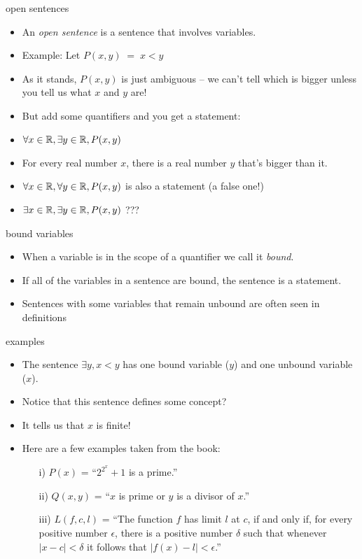 \documentclass[landscape]{beamer}
\begin{document}
\begin{frame}{open sentences}
\begin{itemize}
\item An {\em open sentence} is a sentence that involves variables.\pause
\item Example: Let $P(x,y) \; = \; x < y$\pause
\item As it stands, $P(x,y)$ is just ambiguous -- we can't tell which is bigger unless you tell us what $x$ and $y$ are!\pause
\item But add some quantifiers and you get a statement: \pause
\item $\forall x \in {\mathbb R}, \exists y \in {\mathbb R}, P(x,y)$ \pause
\item For every real number $x$, there is a real number $y$ that's bigger than it. \pause 
\item $\forall x \in {\mathbb R}, \forall y \in {\mathbb R}, P(x,y)$ \pause is also a statement (a false one!) \pause
\item $\exists x \in {\mathbb R}, \exists y \in {\mathbb R}, P(x,y)$ \pause ???
\end{itemize}
\end{frame}

\begin{frame}{bound variables}
\begin{itemize}
\item When a variable is in the scope of a quantifier we call it {\em bound}.\pause
\item If all of the variables in a sentence are bound, the sentence is a statement.\pause
\item Sentences with some variables that remain unbound are often seen in definitions\pause
\end{itemize}
\end{frame}

\begin{frame}{examples}
\begin{itemize}
\item The sentence $\exists y, x<y$ has one bound variable ($y$) and one unbound variable ($x$). \pause
\item Notice that this sentence defines some concept?\pause
\item It tells us that $x$ is finite!\pause
\item Here are a few examples taken from the book:\pause
\begin{itemize}
\item[i)] $P(x)$ = ``$2^{2^x}+1$ is a prime.'' \pause

\item[ii)] $Q(x,y)$ = ``$x$ is prime or $y$ is a divisor of $x$.'' \pause

\item[iii)] $L(f,c,l)$ = ``The function $f$ has limit $l$ at $c$, if 
and only if, 
for every positive number $\epsilon$, there is a positive number $\delta$ 
such that whenever $|x-c| < \delta$ it follows that $|f(x)-l| < \epsilon$.''  
\end{itemize}
\end{itemize}
\end{frame}
\end{document}
